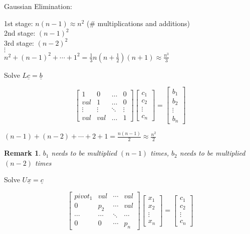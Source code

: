 \documentclass[12pt,a4paper]{article}
\newtheorem*{rem}{Remark}
\newcommand{\Remark}[1]{
  \begin{rem}
    \color{cyan}
    #1
  \end{rem}
}
\begin{document}
Gaussian Elimination:

1st stage: $n(n-1) \approx n^2$ (\# multiplications and additions) \\
2nd stage: $(n-1)^2$ \\
3rd stage: $(n-2)^2$ \\
$\vdots$ \\
$n^2 + (n-1)^2 + \cdots + 1^2 = \frac{1}{3}n(n+\frac{1}{2})(n+1) \approx \frac{n^3}{3}$

Solve $L\underline{c} = \underline{b}$

\[
  \begin{bmatrix}
    1 & 0 & \hdots & 0 \\
    val & 1 & \hdots & 0 \\
    \vdots & \vdots & \ddots & \vdots \\
    val & val & \hdots & 1
  \end{bmatrix}
  \begin{bmatrix}
    c_1 \\
    c_2 \\
    \vdots \\
    c_n
  \end{bmatrix} =
  \begin{bmatrix}
    b_1 \\
    b_2 \\
    \vdots \\
    b_n
  \end{bmatrix}
\]

$(n-1) + (n-2) + \cdots + 2 + 1 = \frac{n(n-1)}{2} \approx \frac{n^2}{2}$


\Remark{$b_1$ needs to be multiplied $(n-1)$ times, $b_2$ needs to be multiplied $(n-2)$ times}

Solve $U\underline{x} = \underline{c}$

\[
  \begin{bmatrix}
    pivot_1 & val & \cdots & val \\
    0 & p_2 & \cdots & val \\
    \cdots & \cdots & \ddots & \cdots \\
    0 & 0 & \cdots & p_n
  \end{bmatrix}
  \begin{bmatrix}
    x_1 \\
    x_2 \\
    \vdots \\
    x_n
  \end{bmatrix} =
  \begin{bmatrix}
    c_1 \\
    c_2 \\
    \vdots \\
    c_n
  \end{bmatrix}
\]
\end{document}

